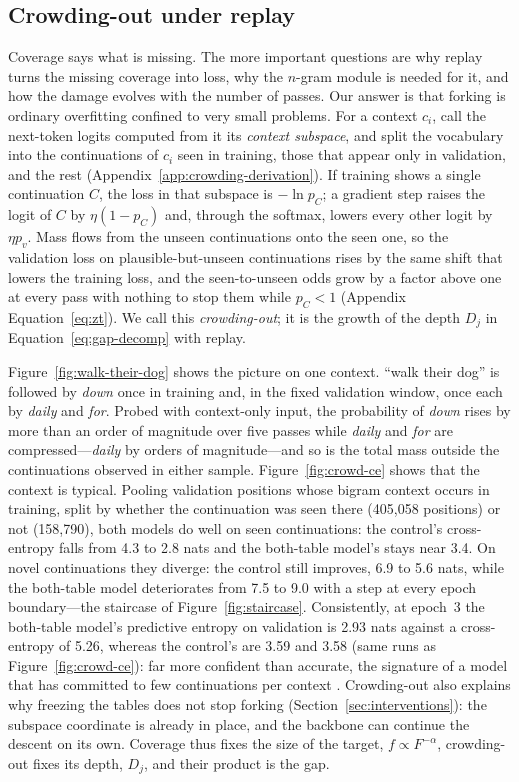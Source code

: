 \subsection{Crowding-out under replay}
\label{sec:sharpening}
Coverage says what is missing. The more important questions are why replay turns the missing coverage into loss, why the $n$-gram module is needed for it, and how the damage evolves with the number of passes. Our answer is that forking is ordinary overfitting confined to very small problems. For a context $c_i$, call the next-token logits computed from it its \emph{context subspace}, and split the vocabulary into the continuations of $c_i$ seen in training, those that appear only in validation, and the rest (Appendix~\ref{app:crowding-derivation}). If training shows a single continuation $C$, the loss in that subspace is $-\ln p_C$; a gradient step raises the logit of $C$ by $\eta(1-p_C)$ and, through the softmax, lowers every other logit by $\eta p_v$. Mass flows from the unseen continuations onto the seen one, so the validation loss on plausible-but-unseen continuations rises by the same shift that lowers the training loss, and the seen-to-unseen odds grow by a factor above one at every pass with nothing to stop them while $p_C<1$ (Appendix Equation~\eqref{eq:zt}). We call this \emph{crowding-out}; it is the growth of the depth $D_j$ in Equation~\eqref{eq:gap-decomp} with replay.

Figure~\ref{fig:walk-their-dog} shows the picture on one context. ``walk their dog'' is followed by \emph{down} once in training and, in the fixed validation window, once each by \emph{daily} and \emph{for}. Probed with context-only input, the probability of \emph{down} rises by more than an order of magnitude over five passes while \emph{daily} and \emph{for} are compressed---\emph{daily} by orders of magnitude---and so is the total mass outside the continuations observed in either sample. Figure~\ref{fig:crowd-ce} shows that the context is typical. Pooling validation positions whose bigram context occurs in training, split by whether the continuation was seen there (405{,}058 positions) or not (158{,}790), both models do well on seen continuations: the control's cross-entropy falls from 4.3 to 2.8 nats and the both-table model's stays near 3.4. On novel continuations they diverge: the control still improves, 6.9 to 5.6 nats, while the both-table model deteriorates from 7.5 to 9.0 with a step at every epoch boundary---the staircase of Figure~\ref{fig:staircase}. Consistently, at epoch~3 the both-table model's predictive entropy on validation is 2.93 nats against a cross-entropy of 5.26, whereas the control's are 3.59 and 3.58 (same runs as Figure~\ref{fig:crowd-ce}): far more confident than accurate, the signature of a model that has committed to few continuations per context \citep{carlsson2025hyperfitting}. Crowding-out also explains why freezing the tables does not stop forking (Section~\ref{sec:interventions}): the subspace coordinate is already in place, and the backbone can continue the descent on its own. Coverage thus fixes the size of the target, $f\propto F^{-\alpha}$, crowding-out fixes its depth, $D_j$, and their product is the gap.

